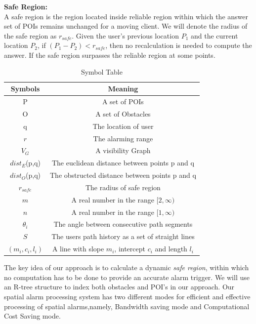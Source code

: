 \textbf{Safe Region:}\\ 
\hspace*{3cm} A safe region is the region located inside reliable region within which the answer set of POIs remains unchanged for a moving client. We will denote the radius of the safe region as $r_{safe}$. Given the user's previous location $P_1$ and the current location $P_2$, if $(P_1 - P_2) < r_{safe}$, then no recalculation is needed to compute the answer. If the safe region surpasses the reliable region at some points. \\ 



\begin{table}[h]
\centering 

\caption{Symbol Table}
\begin{tabular}{|c|c|} \hline
Symbols&Meaning \\ \hline
P &  A set of POIs\\ \hline
O & A set of Obstacles\\ \hline
q & The location of user\\ \hline
$r$ & The alarming range\\ \hline
$V_{G}$       & A visibility Graph\\ \hline
$dist_E$(p,q) & The euclidean distance between points p and q\\ \hline
$dist_O$(p,q) & The obstructed distance between points p and q\\ \hline
$r_{safe}$    & The radius of safe region\\ \hline
$m$           & A real number in the range $[2,\infty)$ \\ \hline
$n$           & A real number in the range $[1,\infty) $  \\ \hline
$\theta_i $   & The angle between consecutive path segments \\ \hline 
$ S $         & The users path history as a set of straight lines \\ \hline
$(m_i,c_i,l_i)$ & A line with slope $m_i$, intercept $c_i$ and length $l_i$ \\ \hline

\end{tabular}
\end{table}
\vspace*{12pt}

The key idea of our approach is to calculate a dynamic \textit{safe region}, within which no computation has to be done to provide an accurate alarm trigger. We will use an R-tree structure to index both obstacles and POI's in our approach. Our spatial alarm processing system has two different modes for efficient and effective processing of spatial alarms,namely, Bandwidth saving mode and Computational Cost Saving mode.\\

